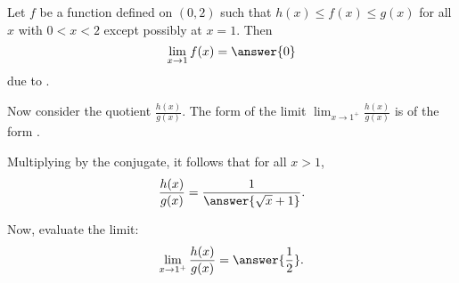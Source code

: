 \documentclass{ximera}
\begin{document}
\begin{exercise}
\begin{exercise}
	Let $f$ be a function defined on $(0,2)$ such that $h(x)\le f(x)\le
	g(x)$ for all $x$ with $0<x<2$ except possibly at $x=1$. Then
	\[ \lim_{x\to 1}f(x)= \answer{0} \]
	due to .

		\begin{exercise}
			Now consider the quotient $\frac{h(x)}{g(x)}$. The form of the limit $\lim_{x\to 1^+}\frac{h(x)}{g(x)}$ is of the form 
			.

			\begin{exercise}
				Multiplying by the conjugate, it follows that for all $x>1$,  
				\[ \frac{h(x)}{g(x)}=\frac{1}{\answer{\sqrt{x}+1}}. \]

				\begin{exercise}
					Now, evaluate the limit:
					\[ \lim_{x\to 1^+}\frac{h(x)}{g(x)}=\answer{\frac{1}{2}}. \]
				\end{exercise}
			\end{exercise}
		\end{exercise}
	\end{exercise}
\end{exercise}
\end{document}
